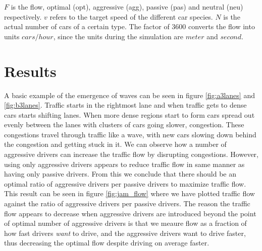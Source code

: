 \documentclass[11pt,a4paper,twocolumn]{article}
\begin{document}
$F$ is the flow, optimal (opt), aggressive (agg), passive (pas) and neutral (neu) respectively. $v$ refers to the target speed of the different car species. $N$ is the actual number of cars of a certain type. The factor of $3600$ converts the flow into units $cars/hour$, since the units during the simulation are $meter$ and $second$.


\section{Results}


A basic example of the emergence of waves can be seen in figure \ref{fig:a3lanes} and \ref{fig:b3lanes}. Traffic starts in the rightmost lane and when traffic gets to dense cars starts shifting lanes. When more dense regions start to form cars spread out evenly between the lanes with clusters of cars going slower, congestion. These congestions travel through traffic like a wave, with new cars slowing down behind the congestion and getting stuck in it.
We can observe how a number of aggressive drivers can increase the traffic flow by disrupting congestions. However, using only aggressive drivers appears to reduce traffic flow in same manner as having only passive drivers. From this we conclude that there should be an optimal ratio of aggressive drivers per passive drivers to maximize traffic flow. This result can be seen in figure \ref{fig:jam_flow} where we have plotted traffic flow against the ratio of aggressive drivers per passive drivers.
The reason the traffic flow appears to decrease when aggressive drivers are introduced beyond the point of optimal number of aggressive drivers is that we meaure flow as a fraction of how fast drivers \textit{want} to drive, and the aggressive drivers want to drive faster, thus decreasing the optimal flow despite driving on average faster.
\end{document}
